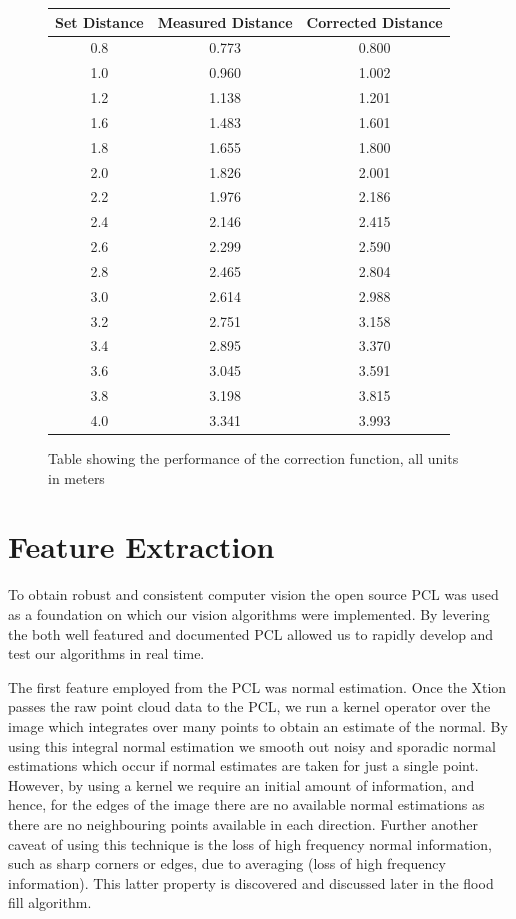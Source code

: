 \documentclass[]{article}
\begin{document}
{\begin{figure}[htb]
	\begin{center}
	\begin{tabular}{ccc}
		\hline

		\hline
		\textbf{Set Distance}& \textbf{Measured Distance}& \textbf{Corrected Distance} \\
		\hline
		0.8		& 0.773	& 0.800\\
		1.0		& 0.960	& 1.002\\
		1.2 	& 1.138	& 1.201\\
		1.6 	& 1.483	& 1.601\\
		1.8 	& 1.655	& 1.800\\
		2.0 	& 1.826	& 2.001\\
		2.2 	& 1.976	& 2.186\\
		2.4 	& 2.146	& 2.415\\
		2.6 	& 2.299	& 2.590\\
		2.8 	& 2.465	& 2.804\\
		3.0 	& 2.614	& 2.988\\
		3.2 	& 2.751	& 3.158\\
		3.4 	& 2.895	& 3.370\\
		3.6 	& 3.045	& 3.591\\
		3.8 	& 3.198	& 3.815\\
		4.0 	& 3.341	& 3.993\\
		\hline

		\hline
	\end{tabular}
	\end{center}
	\caption{Table showing the performance of the correction function, all units in meters}
	\label{tab:averages}
\end{figure}


\clearpage


\section{Feature Extraction} %
\label{sec:feature_extraction}

To obtain robust and consistent computer vision the open source \ac{PCL} was used as a foundation on which our vision algorithms were implemented. By levering the both well featured and documented \ac{PCL} allowed us to rapidly develop and test our algorithms in real time. 

The first feature employed from the \ac{PCL} was normal estimation. Once the Xtion passes the raw point cloud data to the \ac{PCL}, we run a kernel operator over the image which integrates over many points to obtain an estimate of the normal. By using this integral normal estimation we smooth out noisy and sporadic normal estimations which occur if normal estimates are taken for just a single point. However, by using a kernel we require an initial amount of information, and hence, for the edges of the image there are no available normal estimations as there are no neighbouring points available in each direction. Further another caveat of using this technique is the loss of high frequency normal information, such as sharp corners or edges, due to averaging (loss of high frequency information). This latter property is discovered and discussed later in the flood fill algorithm. 

}
\end{document}
